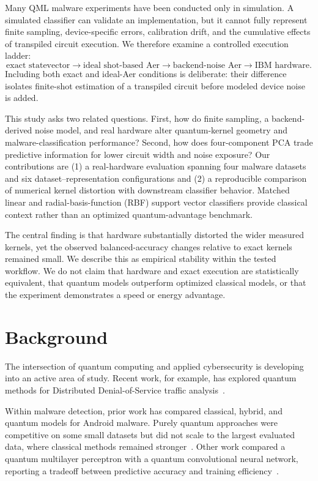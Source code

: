 \documentclass[letterpaper]{article} %
\begin{document}
Many QML malware experiments have been conducted only in simulation. A simulated classifier can validate an implementation, but it cannot fully represent finite sampling, device-specific errors, calibration drift, and the cumulative effects of transpiled circuit execution. We therefore examine a controlled execution ladder:
\[
\text{exact statevector}
\rightarrow \text{ideal shot-based Aer}
\rightarrow \text{backend-noise Aer}
\rightarrow \text{IBM hardware}.
\]
Including both exact and ideal-Aer conditions is deliberate: their difference isolates finite-shot estimation of a transpiled circuit before modeled device noise is added.

This study asks two related questions. First, how do finite sampling, a backend-derived noise model, and real hardware alter quantum-kernel geometry and malware-classification performance? Second, how does four-component PCA trade predictive information for lower circuit width and noise exposure? Our contributions are (1) a real-hardware evaluation spanning four malware datasets and six dataset--representation configurations and (2) a reproducible comparison of numerical kernel distortion with downstream classifier behavior. Matched linear and radial-basis-function (RBF) support vector classifiers provide classical context rather than an optimized quantum-advantage benchmark.

The central finding is that hardware substantially distorted the wider measured kernels, yet the observed balanced-accuracy changes relative to exact kernels remained small. We describe this as empirical stability within the tested workflow. We do not claim that hardware and exact execution are statistically equivalent, that quantum models outperform optimized classical models, or that the experiment demonstrates a speed or energy advantage.

\section{Background}

The intersection of quantum computing and applied cybersecurity is developing into an active area of study. Recent work, for example, has explored quantum methods for Distributed Denial-of-Service traffic analysis~\cite{cogburn2026hardwareawareqaoahoneypottraffic}.

Within malware detection, prior work has compared classical, hybrid, and quantum models for Android malware. Purely quantum approaches were competitive on some small datasets but did not scale to the largest evaluated data, where classical methods remained stronger~\cite{mercaldo2022towards}. Other work compared a quantum multilayer perceptron with a quantum convolutional neural network, reporting a tradeoff between predictive accuracy and training efficiency~\cite{11249907}.
\end{document}
